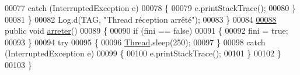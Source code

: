 \begin{DoxyCode}
00077             \textcolor{keywordflow}{catch} (InterruptedException e)
00078             \{
00079                 e.printStackTrace();
00080             \}
00081         \}
00082         Log.d(TAG, \textcolor{stringliteral}{"Thread réception arrêté"});
00083     \}
00084 
\hyperlink{classcom_1_1example_1_1ekawa_1_1_reception_a844c65410aaeee936f6b0d44f9df56db}{00088}     \textcolor{keyword}{public} \textcolor{keywordtype}{void} \hyperlink{classcom_1_1example_1_1ekawa_1_1_reception_a844c65410aaeee936f6b0d44f9df56db}{arreter}()
00089     \{
00090         \textcolor{keywordflow}{if} (fini == \textcolor{keyword}{false})
00091         \{
00092             fini = \textcolor{keyword}{true};
00093         \}
00094         \textcolor{keywordflow}{try}
00095         \{
00096             \hyperlink{class_thread}{Thread}.sleep(250);
00097         \}
00098         \textcolor{keywordflow}{catch} (InterruptedException e)
00099         \{
00100             e.printStackTrace();
00101         \}
00102     \}
00103 \}
\end{DoxyCode}
